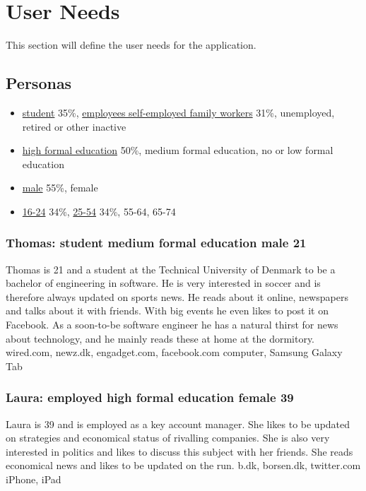 \chapter{User Needs}
This section will define the user needs for the application.

\section{Personas}

\begin{itemize}
	\item \url{student} 35\%, \url{employees self-employed family workers} 31\%, unemployed, retired or other inactive
	\item \url{high formal education} 50\%, medium formal education, no or low formal education
	\item \url{male} 55\%, female
	\item \url{16-24} 34\%, \url{25-54} 34\%, 55-64, 65-74
\end{itemize}

\subsection{Thomas: student medium formal education male 21}
Thomas is 21 and a student at the Technical University of Denmark to be a bachelor of engineering in software. He is very interested in soccer and is therefore always updated on sports news. He reads about it online, newspapers and talks about it with friends. With big events he even likes to post it on Facebook. As a soon-to-be software engineer he has a natural thirst for news about technology, and he mainly reads these at home at the dormitory.
wired.com, newz.dk, engadget.com, facebook.com
computer, Samsung Galaxy Tab

\subsection{Laura: employed high formal education female 39}
Laura is 39 and is employed as a key account manager. She likes to be updated on strategies and economical status of rivalling companies. She is also very interested in politics and likes to discuss this subject with her friends. She reads economical news and likes to be updated on the run.
b.dk, borsen.dk, twitter.com
iPhone, iPad

